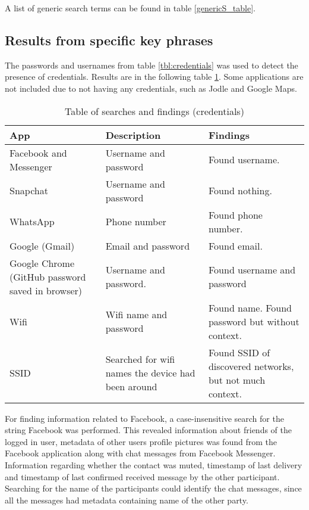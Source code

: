 A list of generic search terms can be found in table \ref{genericS_table}.

\subsection{Results from specific key phrases}
The passwords and usernames from table \ref{tbl:credentials} was used to detect the presence of credentials. Results are in the following table \ref{spesificS_table}. Some applications are not included due to not having any credentials, such as Jodle and Google Maps.

\begin{table}[h]
\centering
\begin{tabular}{|m{2.5cm}|m{2.5cm}|m{2.5cm}|}
\hline
App & Description & Findings \\
\hline
Facebook and Messenger & Username and password & Found username.  \\
\hline
Snapchat & Username and password & Found nothing. \\
\hline
WhatsApp & Phone number & Found phone number. \\
\hline 
Google (Gmail) & Email and password & Found email.\\
\hline
Google Chrome (GitHub password saved in browser) & Username and password. & Found username and password \\
\hline
Wifi & Wifi name and password & Found name. Found password but without context.\\  
\hline
SSID & Searched for wifi names the device had been around & Found SSID of discovered networks, but not much context.  \\  
\hline
\end{tabular}
\caption{Table of searches and findings (credentials)}
\label{spesificS_table}
\end{table}


For finding information related to Facebook, a case-insensitive search for the string Facebook was performed. This revealed information about friends of the logged in user, metadata of other users profile pictures was found from the Facebook application along with chat messages from Facebook Messenger. Information regarding whether the contact was muted, timestamp of last delivery and timestamp of last confirmed received message by the other participant. Searching for the name of the participants could identify the chat messages, since all the messages had metadata containing name of the other party.\\

